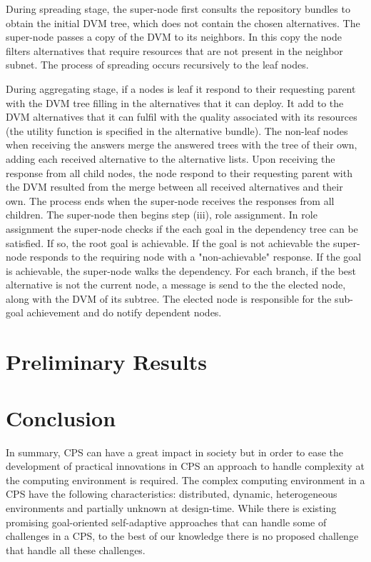 \documentclass[conference]{IEEEtran}
\begin{document}
During spreading stage, the super-node first consults the repository bundles to obtain the initial DVM tree, which does not contain the chosen alternatives. The super-node passes a copy of the DVM to its neighbors. In this copy the node filters alternatives that require resources that are not present in the neighbor subnet. The process of spreading occurs recursively to the leaf nodes. 

During aggregating stage, if a nodes is leaf it respond to their requesting parent with the DVM tree filling in the alternatives that it can deploy. It add to the DVM alternatives that it can fulfil with the quality associated with its resources (the utility function is specified in the alternative bundle). The non-leaf nodes when receiving the answers merge the answered trees with the tree of their own, adding each received alternative to the alternative lists. Upon receiving the response from all child nodes, the node respond to their requesting parent with the DVM resulted from the merge between all received alternatives and their own. The process ends when the super-node receives the responses from all children. The super-node then begins step (iii),  role assignment. In role assignment the super-node checks if the each goal in the dependency tree can be satisfied. If so, the root goal is achievable. If the goal is not achievable the super-node responds to the requiring node with a "non-achievable" response. If the goal is achievable, the super-node walks the dependency. For each branch, if the best alternative is not the current node, a message is send to the the elected node, along with the DVM of its subtree. The elected node is responsible for the sub-goal achievement and do notify dependent nodes. 


\section{Preliminary Results}


\section{Conclusion}
In summary, CPS can have a great impact in society but in order to ease the development of practical innovations in CPS an approach to handle complexity at the computing environment is required. The complex computing environment in a CPS have the following characteristics: distributed, dynamic, heterogeneous environments and partially unknown at design-time. While there is existing promising goal-oriented self-adaptive approaches that can handle some of challenges in a CPS, to the best of our knowledge there is no proposed challenge that handle all these challenges. 
\end{document}

